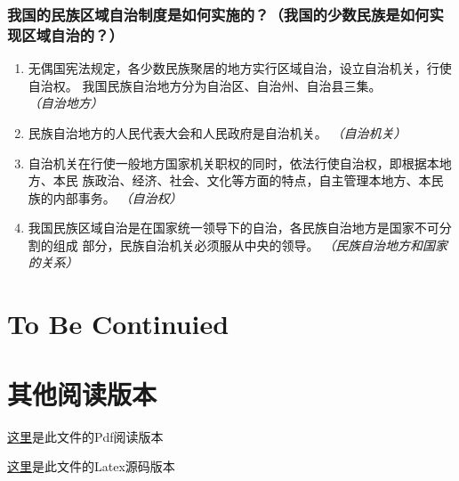 \documentclass[11pt]{article}
\begin{document}
\subsubsection{我国的民族区域自治制度是如何实施的？（我国的少数民族是如何实现区域自治的？）}
\label{sec:org0c57d04}
\begin{enumerate}
\item 无偶国宪法规定，各少数民族聚居的地方实行区域自治，设立自治机关，行使自治权。
我国民族自治地方分为自治区、自治州、自治县三集。 \emph{（自治地方）}
\item 民族自治地方的人民代表大会和人民政府是自治机关。 \emph{（自治机关）}
\item 自治机关在行使一般地方国家机关职权的同时，依法行使自治权，即根据本地方、本民
族政治、经济、社会、文化等方面的特点，自主管理本地方、本民族的内部事务。
\emph{（自治权）}
\item 我国民族区域自治是在国家统一领导下的自治，各民族自治地方是国家不可分割的组成
部分，民族自治机关必须服从中央的领导。 \emph{（民族自治地方和国家的关系）}
\end{enumerate}
\section{To Be Continuied}
\label{sec:org9a94ff6}
\section{其他阅读版本}
\label{sec:org88e5bb6}
\href{./八下早读材料/八下早读材料.pdf}{这里}是此文件的Pdf阅读版本

\href{./八下早读材料/八下早读材料.tex}{这里}是此文件的Latex源码版本
\end{document}
